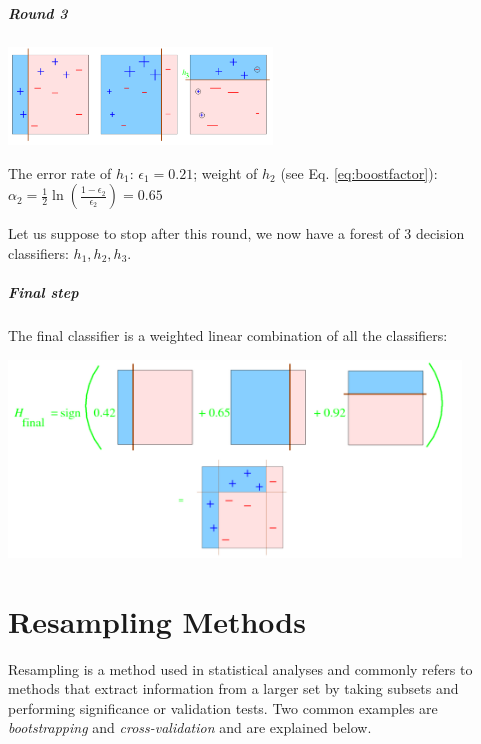 \begin{appendices}
\paragraph{Round 3}

\begin{center}
\includegraphics[width=7cm]{appendix/img/adaboost4.png}
\end{center}

The error rate of $h_1$: $\epsilon_1 = 0.21$; weight of $h_2$ (see Eq. \ref{eq:boostfactor}): $\alpha_2 = \frac{1}{2} \ln\left(\frac{1-\epsilon_2}{\epsilon_2}\right) = 0.65$

Let us suppose to stop after this round, we now have a forest of 3 decision classifiers: $h_1,h_2,h_3$.

\paragraph{Final step}
The final classifier is a weighted linear combination of all the classifiers:


\begin{center}
\includegraphics[width=12cm]{appendix/img/adaboost5.png}
\end{center}


\chapter{Resampling Methods}
\label{ch:resampling}
Resampling is a method used in statistical analyses and commonly refers to methods that extract information from a larger set by taking subsets and performing significance or validation tests. Two common examples are \textit{bootstrapping} and \textit{cross-validation} and are explained below.


\end{appendices}
